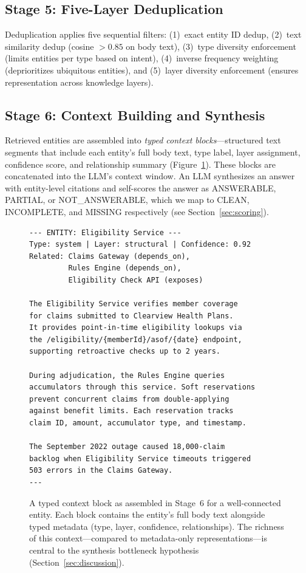 \documentclass[11pt,a4paper]{article}
\begin{document}
\subsection{Stage 5: Five-Layer Deduplication}

Deduplication applies five sequential filters: (1)~exact entity ID dedup, (2)~text similarity dedup (cosine $> 0.85$ on body text), (3)~type diversity enforcement (limits entities per type based on intent), (4)~inverse frequency weighting (deprioritizes ubiquitous entities), and (5)~layer diversity enforcement (ensures representation across knowledge layers).

\subsection{Stage 6: Context Building and Synthesis}

Retrieved entities are assembled into \emph{typed context blocks}---structured text segments that include each entity's full body text, type label, layer assignment, confidence score, and relationship summary (Figure~\ref{fig:context-block}). These blocks are concatenated into the LLM's context window. An LLM synthesizes an answer with entity-level citations and self-scores the answer as ANSWERABLE, PARTIAL, or NOT\_ANSWERABLE, which we map to CLEAN, INCOMPLETE, and MISSING respectively (see Section~\ref{sec:scoring}).

\begin{figure}[t]
\begin{lstlisting}
--- ENTITY: Eligibility Service ---
Type: system | Layer: structural | Confidence: 0.92
Related: Claims Gateway (depends_on),
         Rules Engine (depends_on),
         Eligibility Check API (exposes)

The Eligibility Service verifies member coverage
for claims submitted to Clearview Health Plans.
It provides point-in-time eligibility lookups via
the /eligibility/{memberId}/asof/{date} endpoint,
supporting retroactive checks up to 2 years.

During adjudication, the Rules Engine queries
accumulators through this service. Soft reservations
prevent concurrent claims from double-applying
against benefit limits. Each reservation tracks
claim ID, amount, accumulator type, and timestamp.

The September 2022 outage caused 18,000-claim
backlog when Eligibility Service timeouts triggered
503 errors in the Claims Gateway.
---
\end{lstlisting}
\caption{A typed context block as assembled in Stage~6 for a well-connected entity. Each block contains the entity's full body text alongside typed metadata (type, layer, confidence, relationships). The richness of this context---compared to metadata-only representations---is central to the synthesis bottleneck hypothesis (Section~\ref{sec:discussion}).}
\label{fig:context-block}
\end{figure}
\end{document}
